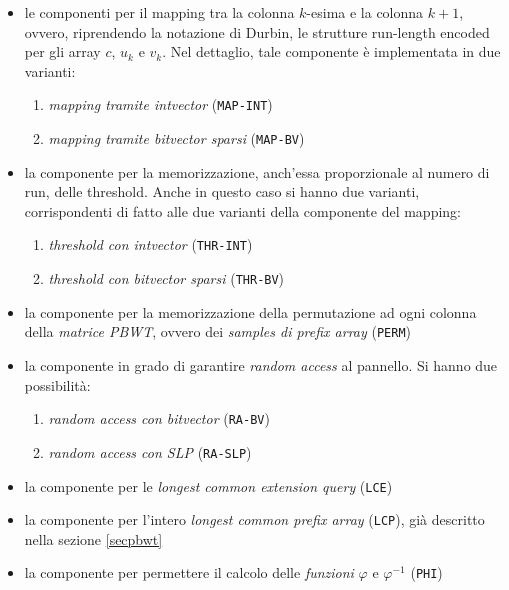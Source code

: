 \begin{itemize}
  \item le componenti per il mapping tra la colonna $k$-esima e la colonna
  $k+1$, ovvero, riprendendo la notazione di Durbin, le strutture run-length
  encoded per gli array $c$, $u_k$ e $v_k$. Nel dettaglio, tale componente è
  implementata in due varianti:
  \begin{enumerate}
    \item \textit{mapping tramite intvector} (\texttt{MAP-INT})
    \item \textit{mapping tramite bitvector sparsi} (\texttt{MAP-BV})
  \end{enumerate}
  \item la componente per la memorizzazione, anch'essa proporzionale al numero
  di run, delle threshold. Anche in questo caso si hanno due varianti,
  corrispondenti di fatto alle due varianti della componente del mapping:
  \begin{enumerate}
    \item \textit{threshold con intvector} (\texttt{THR-INT})
    \item \textit{threshold con bitvector sparsi} (\texttt{THR-BV})
  \end{enumerate}
  \item la componente per la memorizzazione della permutazione ad ogni colonna
  della \textit{matrice PBWT}, ovvero dei \textit{samples di prefix array}
  (\texttt{PERM}) 
  \item la componente in grado di garantire \textit{random access} al
  pannello. Si hanno due possibilità:
  \begin{enumerate}
    \item \textit{random access con bitvector} (\texttt{RA-BV})
    \item \textit{random access con SLP} (\texttt{RA-SLP})
  \end{enumerate}
  \item la componente per le \textit{longest common extension query}
  (\texttt{LCE}) 
  \item la componente per l'intero \textit{longest common prefix array}
  (\texttt{LCP}), già descritto nella sezione \ref{secpbwt}
  \item la componente per permettere il calcolo delle \textit{funzioni}
  $\varphi$ e $\varphi^{-1}$ (\texttt{PHI})
\end{itemize}


